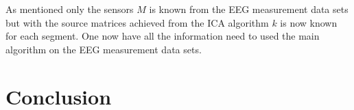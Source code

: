 As mentioned only the sensors $M$ is known from the EEG measurement data sets but with the source matrices achieved from the ICA algorithm $k$ is now known for each segment. One now have all the information need to used the main algorithm on the EEG measurement data sets. 



\section{Conclusion}